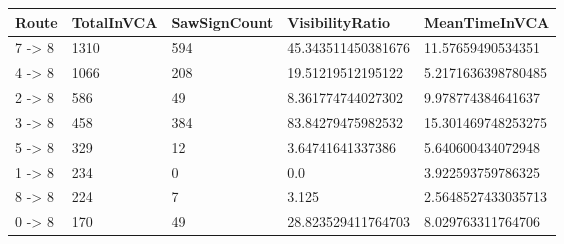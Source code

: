 \begin{tabular}{lllll}
\hline
Route & TotalInVCA & SawSignCount & VisibilityRatio & MeanTimeInVCA \\ \hline
7 -> 8 & 1310 & 594 & 45.343511450381676 & 11.57659490534351 \\
4 -> 8 & 1066 & 208 & 19.51219512195122 & 5.2171636398780485 \\
2 -> 8 & 586 & 49 & 8.361774744027302 & 9.978774384641637 \\
3 -> 8 & 458 & 384 & 83.84279475982532 & 15.301469748253275 \\
5 -> 8 & 329 & 12 & 3.64741641337386 & 5.640600434072948 \\
1 -> 8 & 234 & 0 & 0.0 & 3.922593759786325 \\
8 -> 8 & 224 & 7 & 3.125 & 2.5648527433035713 \\
0 -> 8 & 170 & 49 & 28.823529411764703 & 8.029763311764706 \\
\hline
\end{tabular}
